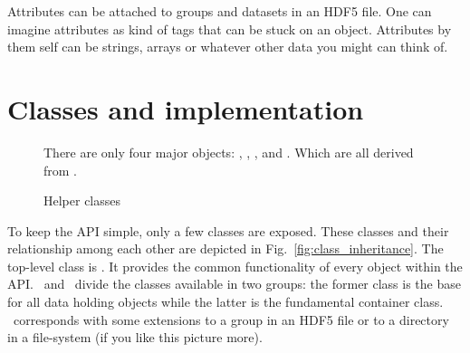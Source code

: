 Attributes can be attached to groups and datasets in an HDF5 file. One  can
imagine attributes as kind of tags that can be stuck on an object. 
Attributes by them self can be strings, arrays or whatever other data you might 
can think of. 


\section{Classes and implementation}\label{section:classes_implementation}

\begin{figure}[tb]
\centering
\begin{minipage}[t]{0.4\linewidth}
\centering
{}
\caption{{\small\label{fig:class_inheritance}
There are only four major objects: \nxobject, \nxfield, \nxgroup, and 
\nxfile. Which are all derived from \nxobject. 
}}
\end{minipage}
\hfill
\begin{minipage}[t]{0.59\linewidth}
\centering
{}
\caption{{\small\label{fig:helper_classes} 
Helper classes
}}
\end{minipage}
\end{figure}
To keep the API simple, only a few classes are exposed. These classes and their 
relationship among each other are depicted in Fig.~\ref{fig:class_inheritance}. 
The top-level class is \nxobject. It provides the common functionality 
of every object within the API. \nxfield\ and \nxgroup\ divide the classes 
available in two groups: the former class is the base for all data holding
objects while the latter is the fundamental container class. 
\nxgroup\ corresponds with some extensions to a group in an HDF5 file or to 
a directory in a file-system (if you like this picture more). 

